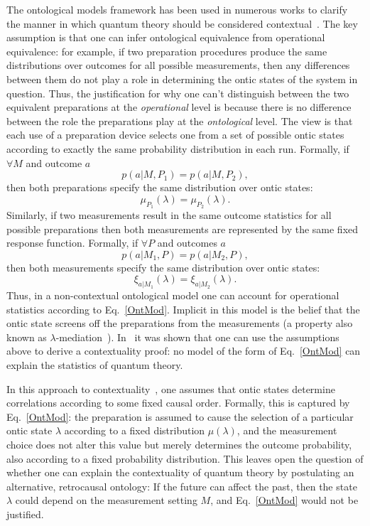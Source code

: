 \documentclass[a4paper,onecolumn,11pt,accepted=2018-05-04]{quantumarticle}
\begin{document}
The ontological models framework has been used in numerous works to clarify the manner in which quantum theory should be considered contextual~\cite{spekkens05, spekkens08, Montina2011, kunjwal2016, Mazurek2016, Schmid2017}. The key assumption is that one can infer ontological equivalence from operational equivalence: for example, if two preparation procedures produce the same distributions over outcomes for all possible measurements,  then any differences between them do not play a role in determining the ontic states of the system in question. Thus, the justification for why one can't distinguish between the two equivalent preparations at the \emph{operational} level is because there is no difference between the role the preparations play at the \emph{ontological} level. The view is that each use of a preparation device selects one from a set of possible ontic states according to exactly the same probability distribution in each run. Formally,  if $\forall M$ and outcome $a$ 
\begin{equation}
 p(a|M,P_1) = p(a|M,P_2),
\end{equation}
%
then both preparations specify the same distribution over ontic states:
\begin{equation}
\mu_{P_1}(\lambda) = \mu_{P_2} (\lambda).
\end{equation}
Similarly, if two measurements result in the same outcome statistics for all possible preparations then both measurements are represented by the same fixed response function. Formally,  if $\forall P$ and outcomes $a$ 
\begin{equation}
 p(a|M_1,P) = p(a|M_2,P),
\end{equation}
%
then both measurements specify the same distribution over ontic states:
\begin{equation}
\xi_{a|M_1}(\lambda) = \xi_{a|M_2}(\lambda).
\end{equation}
Thus, in a non-contextual ontological model one can account for operational statistics according to Eq.~\ref{OntMod}. Implicit in this model is the belief that the ontic state screens off the preparations from the measurements (a property also known as $\lambda$-mediation~\cite{Leifer2016}).
In~\cite{spekkens08} it was shown that one can use the assumptions above to derive a contextuality proof: no model of the form of Eq.~\ref{OntMod} can explain the statistics of quantum theory.

In this approach to contextuality~\cite{spekkens05, spekkens08, Montina2011, kunjwal2016, Mazurek2016, Schmid2017}, one assumes that ontic states determine correlations according to some fixed causal order.  Formally, this is captured by Eq.~\ref{OntMod}: the preparation is assumed to cause the selection of a particular ontic state $\lambda$ according to a fixed distribution $\mu(\lambda)$, and the measurement choice does not alter this value but merely determines the outcome probability, also according to a fixed probability distribution. This leaves open the question of whether one can explain the contextuality of quantum theory by postulating an alternative, retrocausal ontology: If the future can affect the past, then the state $\lambda$ could depend on the measurement setting $M$, and Eq.~\eqref{OntMod} would not be justified.
\end{document}
